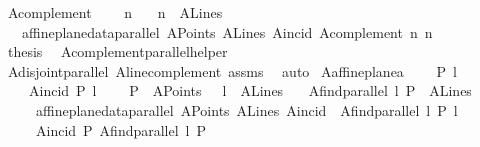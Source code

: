 \begin{isabellebody}
\ A{}complement{\isacharcolon}{\kern0pt}\ \isanewline
\ \ \ n\isanewline
\ \ \ {\isachardoublequoteopen}n\ {\isasymin}\ A{}Lines{\isachardoublequoteclose}\isanewline
\ \ \ {\isachardoublequoteopen}affine{\isacharunderscore}{\kern0pt}plane{\isacharunderscore}{\kern0pt}data{\isachardot}{\kern0pt}parallel\ A{}Points\ A{}Lines\ A{}incid\ {\isacharparenleft}{\kern0pt}A{}complement\ n{\isacharparenright}{\kern0pt}\ n{\isachardoublequoteclose}\isanewline
%
\isadelimproof
%
\endisadelimproof
%
\isatagproof
{}\isamarkupfalse%
\ {\isacharminus}{\kern0pt}\isanewline
\ \ \isamarkupfalse%
\ {\isacharquery}{\kern0pt}thesis\ \isamarkupfalse%
\ A{}complement{\isacharunderscore}{\kern0pt}parallel{\isacharunderscore}{\kern0pt}helper\isanewline
\ \ \ \ \isamarkupfalse%
\ A{}disjoint{\isacharunderscore}{\kern0pt}parallel\ A{}line{\isacharunderscore}{\kern0pt}complement\ assms\ \isamarkupfalse%
\ auto\isanewline
{}\isamarkupfalse%
%
\endisatagproof
{\isafoldproof}%
%
\isadelimproof
\isanewline
%
\endisadelimproof
\isanewline
{}\isamarkupfalse%
\ A{}affine{\isacharunderscore}{\kern0pt}plane{\isacharunderscore}{\kern0pt}a{}{\isacharcolon}{\kern0pt}\ \isanewline
\ \ \ P\ l\isanewline
\ \ \ {\isachardoublequoteopen}{\isasymnot}\ A{}incid\ P\ l{\isachardoublequoteclose}\ \isanewline
\ \ \ {\isachardoublequoteopen}P\ {\isasymin}\ A{}Points\ {\isachardoublequoteclose}\ \ {\isachardoublequoteopen}l\ {\isasymin}\ A{}Lines{\isachardoublequoteclose}\isanewline
\ \ \ {\isachardoublequoteopen}A{}find{\isacharunderscore}{\kern0pt}parallel\ l\ P\ {\isasymin}\ A{}Lines{\isachardoublequoteclose}\ \isanewline
\ \ \ \ \ {\isachardoublequoteopen}affine{\isacharunderscore}{\kern0pt}plane{\isacharunderscore}{\kern0pt}data{\isachardot}{\kern0pt}parallel\ A{}Points\ A{}Lines\ A{}incid\ \ {\isacharparenleft}{\kern0pt}A{}find{\isacharunderscore}{\kern0pt}parallel\ l\ P{\isacharparenright}{\kern0pt}\ l{\isachardoublequoteclose}\ \isanewline
\ \ \ \ \ {\isachardoublequoteopen}A{}incid\ P\ {\isacharparenleft}{\kern0pt}A{}find{\isacharunderscore}{\kern0pt}parallel\ l\ P{\isacharparenright}{\kern0pt}{\isachardoublequoteclose}\isanewline

\end{isabellebody}
